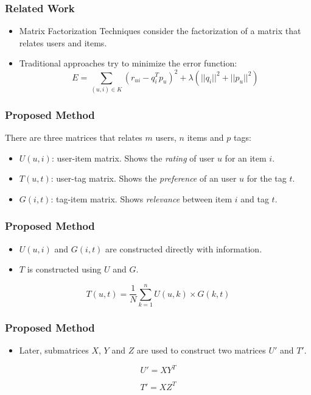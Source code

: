 \documentclass[aspectratio=169,handout]{beamer}
\begin{document}
\begin{frame}
\frametitle{Related Work}
\begin{itemize}
\item Matrix Factorization Techniques consider the factorization of a matrix that relates users and items.
\pause
\item Traditional approaches try to minimize the error function:
\begin{equation}
E = \sum_{(u,i)\in K} (r_{ui}-q_i^Tp_{u})^2 + \lambda(||q_i||^2+||p_u||^2)
\end{equation}
\end{itemize}
\end{frame}

\begin{frame}
\frametitle{Proposed Method}
There are three matrices that relates $m$ users, $n$ items and $p$ tags: \pause
\begin{itemize}
\item $U(u,i)$: user-item matrix. Shows the \textit{rating} of user $u$ for an item $i$.\pause
\item $T(u,t)$: user-tag matrix. Shows the \textit{preference} of an user $u$ for the tag $t$.\pause
\item $G(i,t)$: tag-item matrix. Shows \textit{relevance} between item $i$ and tag $t$.
\end{itemize}
\end{frame}

\begin{frame}
\frametitle{Proposed Method}
\begin{itemize}
\item $U(u,i)$ and $G(i,t)$ are constructed directly with information.
\pause
\item $T$ is constructed using $U$ and $G$.
\end{itemize}
\begin{equation}
\label{eq:t}
T(u,t) = \frac{1}{N} \sum_{k=1}^{n}U(u,k) \times G(k,t)
\end{equation}
\end{frame}

\begin{frame}
\frametitle{Proposed Method}
\begin{itemize}
\item Later, submatrices $X$, $Y$ and $Z$ are used to construct two matrices $U'$ and $T'$.
\end{itemize}
\begin{equation}
\label{eq:u}
U' = XY^T
\end{equation} 

\begin{equation}
\label{eq:u}
T' = XZ^T
\end{equation} 
\end{frame}
\end{document}
